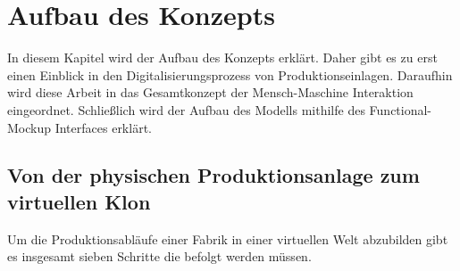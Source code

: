 \chapter{Aufbau des Konzepts}\label{cha:AufbauDesKonzepts}

In diesem Kapitel wird der Aufbau des Konzepts erklärt. Daher gibt es zu erst einen Einblick in den Digitalisierungsprozess von Produktionseinlagen. Daraufhin wird diese Arbeit in das Gesamtkonzept der Mensch-Maschine Interaktion eingeordnet. Schließlich wird der Aufbau des Modells mithilfe des Functional-Mockup Interfaces erklärt.

\section{Von der physischen Produktionsanlage zum virtuellen Klon}\label{sec:PhysischZumKlon}

Um die Produktionsabläufe einer Fabrik in einer virtuellen Welt abzubilden gibt es insgesamt sieben Schritte die befolgt werden müssen.

